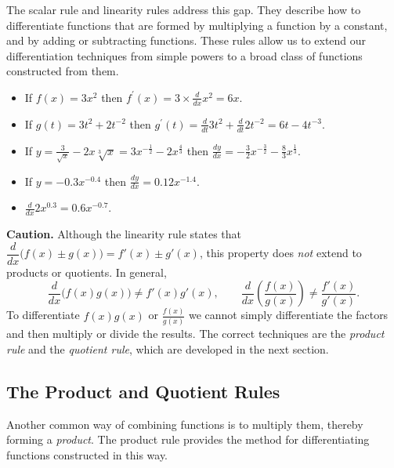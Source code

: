 The scalar rule and linearity rules address this gap. They describe how to differentiate functions that are formed by multiplying a function by a constant, and by adding or subtracting functions. These rules allow us to extend our differentiation techniques from simple powers to a broad class of functions constructed from them.

\begin{example}
    \begin{itemize}
        \item If \(f(x)=3 x^2\) then \(f^{\prime}(x)=3 \times \frac{d}{d x} x^2=6 x\). \vspace{0.5em}
        \item If \(g(t)=3 t^2+2 t^{-2}\) then \(g^{\prime}(t)=\frac{d}{d t} 3 t^2+\frac{d}{d t} 2 t^{-2}=6 t-4 t^{-3}\). \vspace{0.5em}
        \item If \(y=\frac{3}{\sqrt{x}}-2 x \sqrt[3]{x}=3 x^{-\frac{1}{2}}-2 x^{\frac{4}{3}}\) then \(\frac{d y}{d x}=-\frac{3}{2} x^{-\frac{3}{2}}-\frac{8}{3} x^{\frac{1}{3}}\). \vspace{0.5em}
        \item If \(y=-0.3 x^{-0.4}\) then \(\frac{d y}{d x}=0.12 x^{-1.4}\). \vspace{0.5em}
        \item \(\frac{d}{d x} 2 x^{0.3}=0.6 x^{-0.7}\).
    \end{itemize}
    
\end{example}

\textbf{Caution.} Although the linearity rule states that $\dfrac{d}{dx}\big(f(x)\pm g(x)\big)=f'(x)\pm g'(x)$, this property does \emph{not} extend to products or quotients. In general,
\[
\frac{d}{dx}\big(f(x)g(x)\big)\neq f'(x)g'(x),
\qquad
\frac{d}{dx}\left(\frac{f(x)}{g(x)}\right)\neq \frac{f'(x)}{g'(x)}.
\]
To differentiate $f(x)g(x)$ or $\frac{f(x)}{g(x)}$ we cannot simply differentiate the factors and then multiply or divide the results. The correct techniques are the \emph{product rule} and the \emph{quotient rule}, which are developed in the next section.

\subsection*{The Product and Quotient Rules}

Another common way of combining functions is to multiply them, thereby forming a \emph{product}. The product rule provides the method for differentiating functions constructed in this way. 

